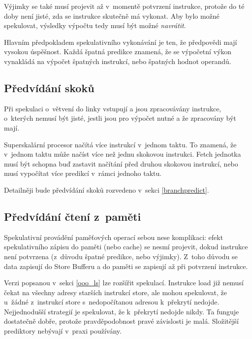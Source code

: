 Výjimky se také musí projevit až v~momentě potvrzení instrukce, protože do té doby není jisté, zda se instrukce skutečně má vykonat. 
Aby bylo možné spekulovat, výsledky výpočtu tedy musí být možné \emph{navrátit}.

Hlavním předpokladem spekulativního vykonávání je ten, že předpovědi mají vysokou úspěšnost.
Každá špatná predikce znamená, že se výpočetní výkon vynakládá na výpočet špatných instrukcí, nebo špatných hodnot operandů.

\subsection{Předvídání skoků}

Při spekulaci o~větvení do linky vstupují a jsou zpracovávány instrukce, o~kterých nemusí být jisté, jestli jsou pro výpočet nutné a že zpracovány být mají.

Superskalární procesor načítá více instrukcí v~jednom taktu.
To znamená, že v~jednom taktu může načíst více než jednu skokovou instrukci.
Fetch jednotka musí být schopna buď zastavit načítání před druhou skokovou instrukcí, nebo musí vypočítat více predikcí v~rámci jednoho taktu.

Detailněji bude předvídání skoků rozvedeno v~sekci \ref{branchpredict}.

\subsection{Předvídání čtení z~paměti}

Spekulativní provádění paměťových operací sebou nese komplikaci: efekt spekulativního zápisu do paměti (nebo cache) se nesmí projevit, dokud instrukce není potvrzena (z~důvodu špatné predikce, nebo výjimky).
Z~toho důvodu se data zapisují do Store Bufferu a do paměti se zapisují až při potvrzení instrukce.  

Verzi popsanou v~sekci \ref{ooo_ls} lze rozšířit spekulací.
Instrukce load již nemusí čekat na všechny adresy starších instrukcí store, ale mohou spekulovat, že u~žádné z~instrukcí store s~nedopočítanou adresou k~překrytí nedojde.
Nejjednodušší strategií je spekulovat, že k~překrytí nedojde nikdy.
Ta funguje dostatečně dobře, protože pravděpodobnost pravé závislosti je malá.
Složitější prediktory nebývají v~praxi používány. 
\cite{moshovos1998memory}

